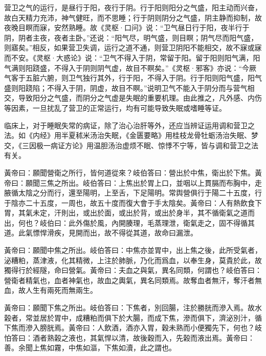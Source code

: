 \documentclass[12pt]{ctexbook}
\begin{document}
营卫之气的运行，是昼行于阳，夜行于阴。行于阳则阳分之气盛，阳主动而兴奋，故白天精力充沛，神气健旺，而不思睡；行于阴则阴分之气盛，阴主静而抑制，故夜晚目瞑而寐，安然熟睡。故《灵枢·口问》说：“卫气昼日行于阳，夜半行于阴，阴者主夜，夜者主卧。”还说：“阳气尽，明气盛，则目瞑；阴气尽而阳气盛，则寤矣。”相反，如果营卫失调，运行之道不通，则营卫阴阳不能相交，故不寐或寐而不安。《灵枢·大惑论》说：“卫气不得入于阴，常留于阳。留于阳则阳气满，阳气满则阳跷盛，不得入于阴则阴气虚，故目不瞑矣。”《灵枢·邪客》亦说：“今厥气客于五脏六腑，则卫气独行其外，行于阳，不得入于阴。行于阳则阳气盛，阳气盛则阳跷陷；不得入于阴，阴虚，故目不瞑。”说明卫气不能入于阴分而与营气相交，导致阳分之气盛，而阴分之气虚是失眠的重要机理。由此推之，凡外感、内伤等因素，一旦扰乱了营卫的正常运行，均有可能导致失眠或嗜睡等证。

临床上，对于睡眠失常的病证，除了治心治肝等外，还应当辨证运用调和营卫之法。如《内经》用半夏秫米汤治失眠，《金匮要略》用桂枝龙骨牡蛎汤治失眠、梦交，《三因极一病证方论》用温胆汤治虚烦不眠、惊悸不宁等，皆与调和营卫之法有关。


\begin{yuanwen}
黃帝曰：願聞營衛之所行，皆何道從來？岐伯答曰：營出於中焦，衛出於下焦。黃帝曰：願聞三焦之所出。岐伯答曰：上焦出於胃上口，並咽以上貫膈而布胸中，走腋循太陰之分而行，還至陽明，上至舌，下足陽明。常舆營俱行于陽二十五度，行于陰亦二十五度，一周也，故五十度而復大會于手太陰矣。黃帝曰：人有熱飲食下胃，其氣未定，汗則出，或出於面，或出於背，或出於身半，其不循衛氣之道而出，何也？岐伯曰：此外傷於風，內開腠理，毛蒸理泄，衛氣走之，固不得循其道。此氣慓悍滑疾，見開而出，故不得從其道，故命曰漏泄。

黃帝曰：願聞中焦之所出。岐伯答曰：中焦亦並胃中，出上焦之後，此所受氣者，泌糟粕，蒸津液，化其精微，上注於肺脈，乃化而爲血，以奉生身，莫貴於此，故獨得行於經隧，命曰營氣。黃帝曰：夫血之與氣，異名同類，何謂也？岐伯答曰：營衛者精氣也，血者神氣也，故血之輿氣，異名同類焉。故奪血者無汗，奪汗者無血，故人生有兩死而無兩生。

黃帝曰：願聞下焦之所出。岐伯答曰：下焦者，別回腸，注於勝胱而滲入焉。故水榖者，常並居於胃中，成糟粕而俱下於大腸，而成下焦，滲而俱下，濟泌別汁，循下焦而滲入膀胱焉。黃帝曰：人飲酒，酒亦入胃，穀未熟而小便獨先下，何也？岐怕答曰：酒者熟榖之液也，其氣悍以清，故後穀而入，先榖而液出焉。黃帝曰：善。余聞上焦如霧，中焦如漚，下焦如瀆，此之謂也。
\end{yuanwen}
\end{document}
